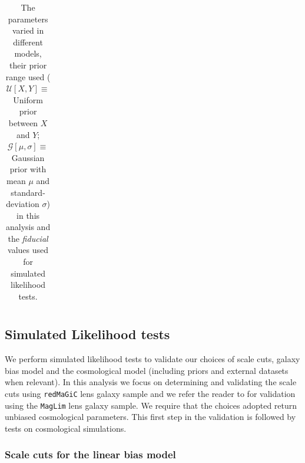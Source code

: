 \documentclass[aps, prd,twocolumn,superscriptaddress,nofootinbib,preprintnumbers]{revtex4-1}
\newcommand{\redmagic}{\texttt{redMaGiC} }
\newcommand{\maglim}{\texttt{MagLim} }
\newcommand{\IR}[1]{{\color{red}[\textbf{Note for IR}: #1]}}
\begin{document}
\begin{table}[H]
\begin{tabular}{|c| c c c|}
\hline
\end{tabular}
\caption{The parameters varied in different models, their prior range used ($\mathcal{U}[X, Y] \equiv$ Uniform prior between $X$ and $Y$; $\mathcal{G}[\mu, \sigma] \equiv$ Gaussian prior with mean $\mu$ and standard-deviation $\sigma$) in this analysis and the \textit{fiducial} values used for simulated likelihood tests.}
\label{tab:params_all}
\end{table}



\subsection{Simulated Likelihood tests}\label{sec:simlike_analysis}


We perform simulated likelihood tests to validate our choices of scale cuts, galaxy bias model and the cosmological model (including priors and external datasets when relevant). In this analysis we focus on determining and validating the scale cuts using \redmagic lens galaxy sample and we refer the reader to \citet{y3-2x2ptaltlensresults} for validation using the \maglim lens galaxy sample. We require that the choices adopted return unbiased cosmological parameters. This first step in the validation is followed by tests on cosmological simulations. 

\subsubsection{Scale cuts for the linear bias model}
\label{sec:sc_linbias}


\end{document}
